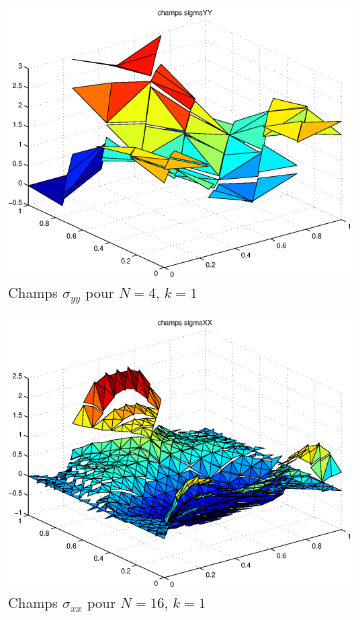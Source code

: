 \begin{figure}[h!]
\begin{subfigure}[b]{0.32\textwidth}
  \includegraphics[width=\textwidth]{images/sigmayyN4.eps}
  \caption{Champs $\sigma_{yy}$ pour $N=4$, $k=1$}
  \end{subfigure}
  \begin{subfigure}[b]{0.32\textwidth}
  \includegraphics[width=\textwidth]{images/sigmaxxN32.eps}
  \caption{Champs $\sigma_{xx}$ pour $N=16$, $k=1$}
  \end{subfigure}
  ~
  \begin{subfigure}[b]{0.32\textwidth}

\end{subfigure}
\end{figure}
